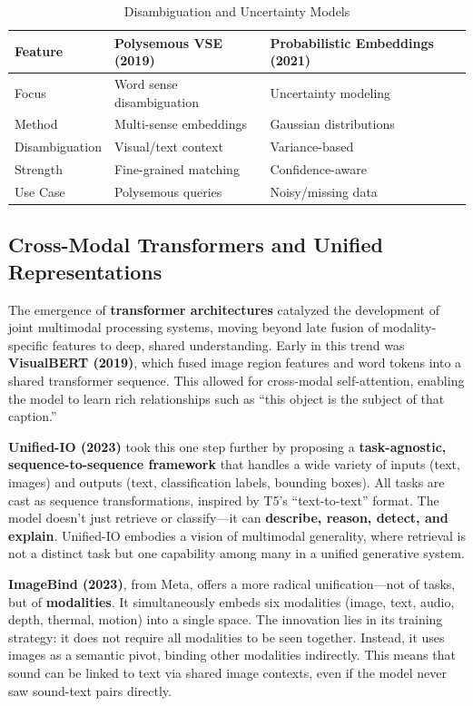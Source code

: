 \documentclass[conference]{IEEEtran}
\begin{document}
\begin{table}[ht]
\centering
\caption{Disambiguation and Uncertainty Models}
\label{tab:uncertainty}
\small
\setlength{\tabcolsep}{4pt}
\begin{tabularx}{\columnwidth}{@{}>{\raggedright\arraybackslash}X>{\raggedright\arraybackslash}X>{\raggedright\arraybackslash}X@{}}
\toprule
\textbf{Feature} & \textbf{Polysemous VSE (2019)} & \textbf{Probabilistic Embeddings (2021)} \\
\midrule
Focus & Word sense disambiguation & Uncertainty modeling \\
Method & Multi-sense embeddings & Gaussian distributions \\
Disambiguation & Visual/text context & Variance-based \\
Strength & Fine-grained matching & Confidence-aware \\
Use Case & Polysemous queries & Noisy/missing data \\
\bottomrule
\end{tabularx}
\end{table}

\subsection{Cross-Modal Transformers and Unified Representations}

The emergence of \textbf{transformer architectures} catalyzed the development of joint multimodal processing systems, moving beyond late fusion of modality-specific features to deep, shared understanding. Early in this trend was \textbf{VisualBERT (2019)}, which fused image region features and word tokens into a shared transformer sequence. This allowed for cross-modal self-attention, enabling the model to learn rich relationships such as “this object is the subject of that caption.”

\textbf{Unified-IO (2023)} took this one step further by proposing a \textbf{task-agnostic, sequence-to-sequence framework} that handles a wide variety of inputs (text, images) and outputs (text, classification labels, bounding boxes). All tasks are cast as sequence transformations, inspired by T5’s “text-to-text” format. The model doesn’t just retrieve or classify—it can \textbf{describe, reason, detect, and explain}. Unified-IO embodies a vision of multimodal generality, where retrieval is not a distinct task but one capability among many in a unified generative system.

\textbf{ImageBind (2023)}, from Meta, offers a more radical unification—not of tasks, but of \textbf{modalities}. It simultaneously embeds six modalities (image, text, audio, depth, thermal, motion) into a single space. The innovation lies in its training strategy: it does not require all modalities to be seen together. Instead, it uses images as a semantic pivot, binding other modalities indirectly. This means that sound can be linked to text via shared image contexts, even if the model never saw sound-text pairs directly.
\end{document}
